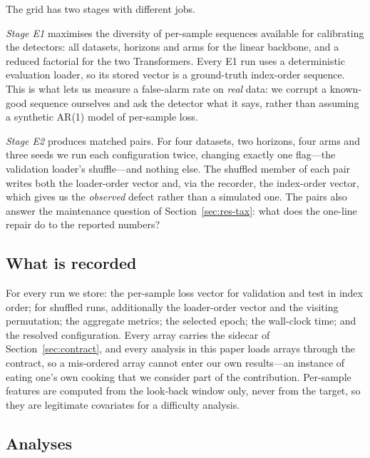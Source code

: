 \documentclass[a4paper,fleqn]{cas-sc}
\begin{document}
The grid has two stages with different jobs.

\emph{Stage E1} maximises the diversity of per-sample sequences available for
calibrating the detectors: all datasets, horizons and arms for the linear backbone,
and a reduced factorial for the two Transformers. Every E1 run uses a
deterministic evaluation loader, so its stored vector is a ground-truth
index-order sequence. This is what lets us measure a false-alarm rate on
\emph{real} data: we corrupt a known-good sequence ourselves and ask the detector
what it says, rather than assuming a synthetic AR(1) model of per-sample loss.

\emph{Stage E2} produces matched pairs. For four datasets, two horizons, four arms
and three seeds we run each configuration twice, changing exactly one flag---the
validation loader's shuffle---and nothing else. The shuffled member of each pair
writes both the loader-order vector and, via the recorder, the index-order vector,
which gives us the \emph{observed} defect rather than a simulated one. The pairs
also answer the maintenance question of Section~\ref{sec:res-tax}: what does the
one-line repair do to the reported numbers?

\subsection{What is recorded}

For every run we store: the per-sample loss vector for validation and test in
index order; for shuffled runs, additionally the loader-order vector and the
visiting permutation; the aggregate metrics; the selected epoch; the wall-clock
time; and the resolved configuration. Every array carries the sidecar of
Section~\ref{sec:contract}, and every analysis in this paper loads arrays through
the contract, so a mis-ordered array cannot enter our own results---an instance of
eating one's own cooking that we consider part of the contribution. Per-sample
features are computed from the look-back window only, never from the target, so
they are legitimate covariates for a difficulty analysis.

\subsection{Analyses}
\end{document}
